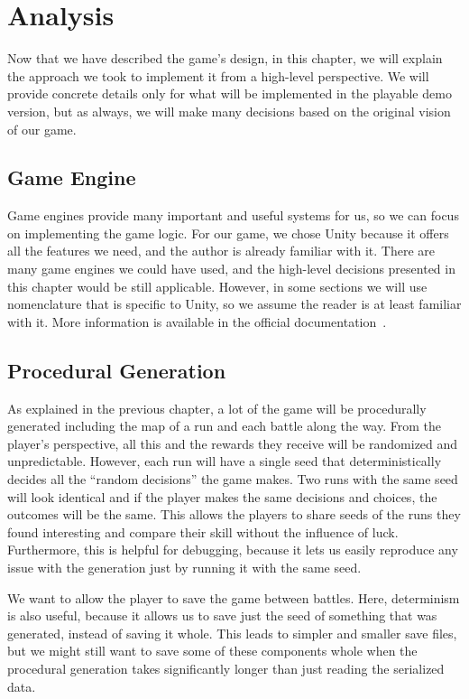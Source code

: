 \chapter{Analysis}

Now that we have described the game's design, in this chapter, we will explain the approach we took to implement it from a high-level perspective.
We will provide concrete details only for what will be implemented in the playable demo version, but as always, we will make many decisions based on the original vision of our game.

\section{Game Engine}

Game engines provide many important and useful systems for us, so we can focus on implementing the game logic.
For our game, we chose Unity because it offers all the features we need, and the author is already familiar with it.
There are many game engines we could have used, and the high-level decisions presented in this chapter would be still applicable.
However, in some sections we will use nomenclature that is specific to Unity, so we assume the reader is at least familiar with it.
More information is available in the official documentation~\cite{UnityDocs}.

\section{Procedural Generation}

As explained in the previous chapter, a lot of the game will be procedurally generated including the map of a run and each battle along the way.
From the player's perspective, all this and the rewards they receive will be randomized and unpredictable.
However, each run will have a single seed that deterministically decides all the \enquote{random decisions} the game makes.
Two runs with the same seed will look identical and if the player makes the same decisions and choices, the outcomes will be the same.
This allows the players to share seeds of the runs they found interesting and compare their skill without the influence of luck.
Furthermore, this is helpful for debugging, because it lets us easily reproduce any issue with the generation just by running it with the same seed.

We want to allow the player to save the game between battles.
Here, determinism is also useful, because it allows us to save just the seed of something that was generated, instead of saving it whole.
This leads to simpler and smaller save files, but we might still want to save some of these components whole when the procedural generation takes significantly longer than just reading the serialized data.


